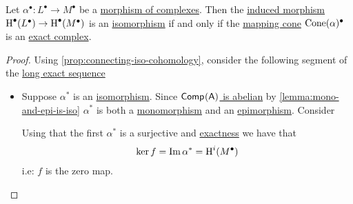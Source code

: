 \documentclass[../../../main]{subfiles}
\begin{document}
\begin{corollary} \label{cor:exactness-mapping-cone}
  Let \(\alpha^{\bullet}: L^{\bullet} \to M^{\bullet}\) be a \hyperref[def:complex-morphism]{morphism of complexes}.
  Then the \hyperref[thm:LES-in-cohomology]{induced morphism} \(\operatorname{H}^{\bullet}(L^{\bullet}) \to \operatorname{H}^{\bullet}(M^{\bullet})\) is an \hyperref[def:categorical-isomorphism]{isomorphism} if and only if the \hyperref[def:mapping-cone]{mapping cone} \(\operatorname{Cone}(\alpha)^{\bullet}\) is an \hyperref[def:exact-complex]{exact complex}.
\end{corollary}
\begin{proof}
  Using \autoref{prop:connecting-iso-cohomology}, consider the following segment of the \hyperref[def:long-exact-sequence]{long exact sequence}
  \begin{center}
  \end{center}
  \begin{itemize}
    \item[\(\implies\)] Suppose \(\alpha^{\ast}\) is an \hyperref[def:categorical-isomorphism]{isomorphism}.
          Since \hyperref[thm:complex-category-is-abelian]{\(\mathsf{Comp}^{}(\mathsf{A})\) is abelian} by \autoref{lemma:mono-and-epi-is-iso} \(\alpha^{\ast}\) is both a \hyperref[def:mono-epi-morphism]{monomorphism} and an \hyperref[def:mono-epi-morphism]{epimorphism}. Consider
          \begin{center}
          \end{center}
          Using that the first \(\alpha^{\ast}\) is a surjective and \hyperref[def:exact-sequence]{exactness} we have that
          \begin{align*}
            \ker f = \operatorname*{Im} \alpha^{\ast} = \operatorname{H}^{i}(M^{\bullet})
          \end{align*}
          i.e: \(f\) is the zero map.


\end{itemize}
\end{proof}
\end{document}
